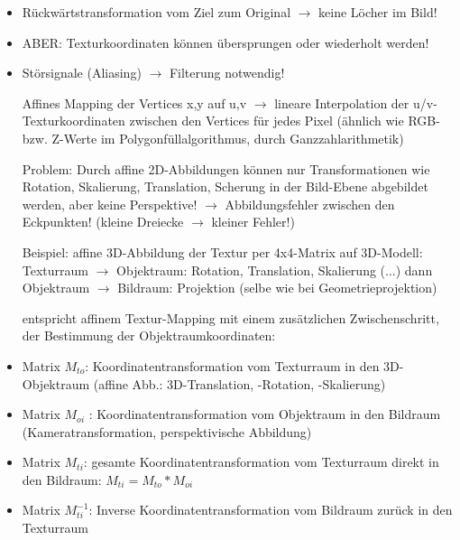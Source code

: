 \documentclass[10pt,landscape]{article}
\begin{document}
\begin{multicols}{3}
{\begin{itemize}
  Für jedes Pixel(x,y) im Polygon: Resampling der Textur(u,v) bei der Rasterkonvertierung (Polygonfüllalgorithmus)
  
  Für jedes Pixel(x,y) finde die Texturkoordinaten(u,v), d.h.:
  \item Rückwärtstransformation vom Ziel zum Original $\rightarrow$ keine Löcher im Bild!
  \item ABER: Texturkoordinaten können übersprungen oder wiederholt werden!
  \item Störsignale (Aliasing) $\rightarrow$ Filterung notwendig!
  
  Affines Mapping der Vertices x,y auf u,v $\rightarrow$ lineare Interpolation der u/v-Texturkoordinaten zwischen den Vertices für jedes Pixel (ähnlich wie RGB- bzw. Z-Werte im Polygonfüllalgorithmus, durch Ganzzahlarithmetik)
  
  
  Problem: Durch affine 2D-Abbildungen können nur Transformationen wie Rotation, Skalierung, Translation, Scherung in der Bild-Ebene abgebildet werden, aber keine Perspektive! $\rightarrow$ Abbildungsfehler zwischen den Eckpunkten! (kleine Dreiecke $\rightarrow$ kleiner Fehler!)
  
  Beispiel: affine 3D-Abbildung der Textur per 4x4-Matrix auf 3D-Modell: 
  Texturraum $\rightarrow$ Objektraum: Rotation, Translation, Skalierung (...) dann Objektraum $\rightarrow$ Bildraum: Projektion (selbe wie bei Geometrieprojektion)
  
  
  entspricht affinem Textur-Mapping mit einem zusätzlichen Zwischenschritt, der Bestimmung der Objektraumkoordinaten:
  \item Matrix $M_{to}$: Koordinatentransformation vom Texturraum in den 3D- Objektraum (affine Abb.: 3D-Translation, -Rotation, -Skalierung)
  \item Matrix $M_{oi}$ : Koordinatentransformation vom Objektraum in den Bildraum (Kameratransformation, perspektivische Abbildung)
  \item Matrix $M_{ti}$: gesamte Koordinatentransformation vom Texturraum direkt in den Bildraum: $M_{ti} = M_{to}*M_{oi}$
  \item Matrix $M_{ti}^{-1}$: Inverse Koordinatentransformation vom Bildraum zurück in den Texturraum
  

\end{itemize}}
\end{multicols}
\end{document}
